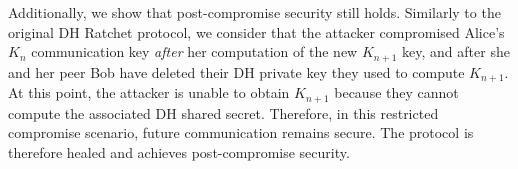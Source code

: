 Additionally, we show that post-compromise security still holds.
Similarly to the original DH Ratchet protocol, we consider that the attacker compromised Alice's $K_n$ communication key \emph{after} her computation of the new $K_{n+1}$ key, and after she and her peer Bob have deleted their DH private key they used to compute $K_{n+1}$.
At this point, the attacker is unable to obtain $K_{n+1}$ because they cannot compute the associated DH shared secret.
Therefore, in this restricted compromise scenario, future communication remains secure.
The protocol is therefore healed and achieves post-compromise security.


